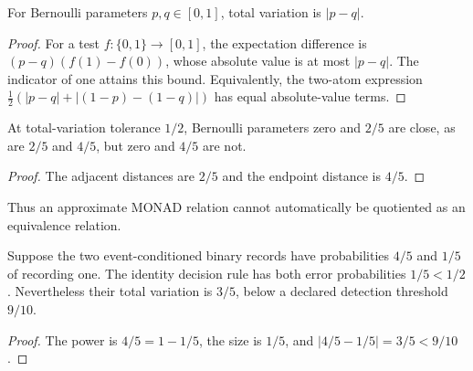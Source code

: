 \begin{lemma}\label{lem:binary-tv}
For Bernoulli parameters $p,q\in[0,1]$, total variation is $|p-q|$.
\end{lemma}
\begin{proof}
For a test $f:\{0,1\}\to[0,1]$, the expectation difference is
$(p-q)(f(1)-f(0))$, whose absolute value is at most $|p-q|$.
The indicator of one attains this bound. Equivalently, the two-atom
expression $\frac12(|p-q|+|(1-p)-(1-q)|)$ has equal absolute-value terms.
\end{proof}

\begin{example}
\label{ex:approximate-nontransitivity}
At total-variation tolerance $1/2$, Bernoulli parameters zero and $2/5$
are close, as are $2/5$ and $4/5$, but zero and $4/5$ are not.
\end{example}
\begin{proof}
The adjacent distances are $2/5$ and the endpoint distance is $4/5$.
\end{proof}
Thus an approximate MONAD relation cannot automatically be quotiented
as an equivalence relation.

\begin{example}
\label{ex:record-threshold}
Suppose the two event-conditioned binary records have probabilities
$4/5$ and $1/5$ of recording one. The identity decision rule has both
error probabilities $1/5<1/2$. Nevertheless their total variation is
$3/5$, below a declared detection threshold $9/10$.
\end{example}
\begin{proof}
The power is $4/5=1-1/5$, the size is $1/5$, and
$|4/5-1/5|=3/5<9/10$.
\end{proof}
